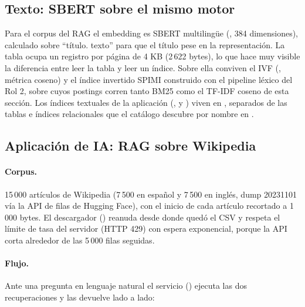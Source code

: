 \subsection{Texto: SBERT sobre el mismo motor}

Para el corpus del RAG el embedding es SBERT multilingüe
(\allowbreak{}, 384 dimensiones), calculado sobre
``título. texto'' para que el título pese en la representación. La tabla
 
ocupa un registro por página de 4 KB (2\,622 bytes), lo que hace muy visible la
diferencia entre leer la tabla y leer un índice. Sobre ella conviven el IVF
(, métrica coseno) y el índice invertido SPIMI construido con el
pipeline léxico del Rol 2, sobre cuyos postings corren tanto BM25 como el TF-IDF
coseno de esta sección. Los índices textuales de la aplicación (,
 y ) viven en , separados de las
tablas e índices relacionales que el catálogo descubre por nombre en .

\subsection{Aplicación de IA: RAG sobre Wikipedia}

\paragraph{Corpus.} 15\,000 artículos de Wikipedia (7\,500 en español y 7\,500 en
inglés, dump 20231101 vía la API de filas de Hugging Face), con el inicio de cada
artículo recortado a 1\,000 bytes. El descargador ()
reanuda desde donde quedó el CSV y respeta el límite de tasa del servidor
(HTTP 429) con espera exponencial, porque la API corta alrededor de las 5\,000 filas
seguidas.

\paragraph{Flujo.} Ante una pregunta en lenguaje natural el servicio
() ejecuta las dos recuperaciones y las devuelve lado a
lado:

